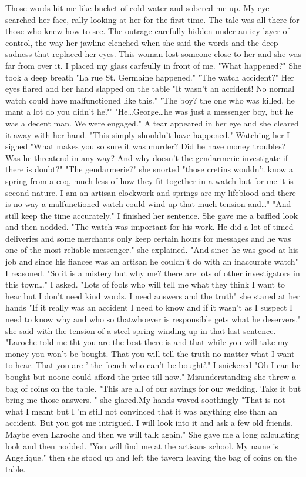 \newscene

Those words hit me like bucket of cold water and sobered me up. My eye searched her face, rally looking at her for the first time. The tale was all there for those who knew how to see. The outrage carefully hidden under an icy layer of control, the way her jawline clenched when she said the words and the deep sadness that replaced her eyes. This woman lost someone close to her and she was far from over it. I placed my glass carfeully in front of me. "What happened?" She took a deep breath "La rue St. Germaine happened." "The watch accident?" Her eyes flared and her hand slapped on the table "It wasn't an accident! No normal watch could have malfunctioned like this." "The boy? the one who was killed, he mant a lot do you didn't he?" "He\dots George\dots he was just a messenger boy, but he was a decent man. We were engaged." A tear appeared in her eye and she cleared it away with her hand. "This simply shouldn't have happened." Watching her I sighed "What makes you so sure it was murder? Did he have money troubles? Was he threatend in any way? And why doesn't the gendarmerie investigate if there is doubt?" "The gendarmerie?" she snorted "those cretins wouldn't know a spring from a coq, much less of how they fit together in a watch but for me it is second nature. I am an artisan clockwork and springs are my lifeblood and there is no way a malfunctioned watch could wind up that much tension and\dots" "And still keep the time accurately." I finished her sentence. She gave me a baffled look and then nodded. "The watch was important for his work. He did a lot of timed deliveries and some merchants only keep certain hours for messages and he was one of the most reliable messenger." she explained. "And since he was good at his job and since his fiancee was an artisan he couldn't do with an inaccurate watch" I reasoned. "So it is a mistery but why me? there are lots of other investigators in this town\dots" I asked. "Lots of fools who will tell me what they think I want to hear but I don't need kind words. I need answers and the truth" she stared at her hands "If it really was an accident I need to know and if it wasn't as I suspect I need to know why and who so thatwhoever is responsible gets what he deservers." she said with the tension of a steel spring winding up in that last sentence. "Laroche told me tht you are the best there is and that while you will take my money you won't be bought. That you will tell the truth no matter what I want to hear. That you are ' the french who can't be bought'." I snickered "Oh I can be bought but noone could afford the price till now." Misunderstanding she threw a bag of coins on the table. "This are all of our savings for our wedding. Take it but bring me those answers. " she glared.My hands waved soothingly "That is not what I meant but I 'm still not convinced that it was anything else than an accident. But you got me intrigued. I will look into it and ask a few old friends. Maybe even Laroche and then we will talk again." She gave me a long calculating look and then nodded. "You will find me at the artisans school. My name is Angelique." then she stood up and left the tavern leaving the bag of coins on the table.

\newscene
